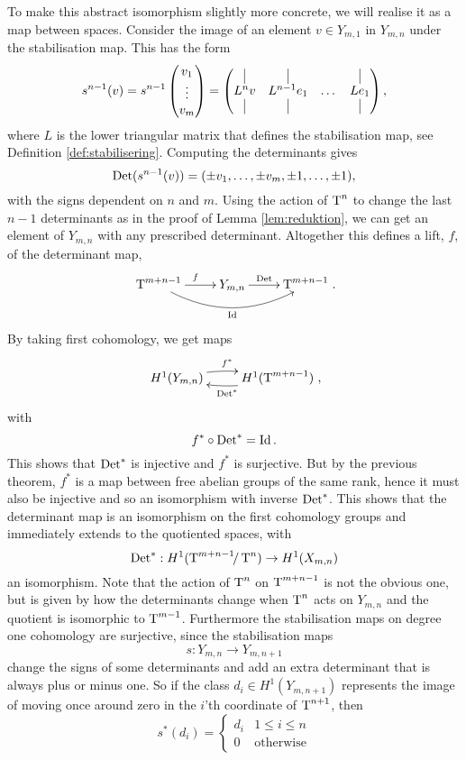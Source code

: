 To make this abstract isomorphism slightly more concrete, we will
realise it as a map between spaces. Consider the image of an element
$v \in Y_{m,1}$ in $Y_{m,n}$ under the stabilisation map. This has the
form 
\[ s^{n-1}(v) = s^{n-1}
\begin{pmatrix}
  v_1 \\
  \vdots \\
  v_m
\end{pmatrix} =
\begin{pmatrix}
  \vrule & \vrule & & \vrule \\
  L^{n} v & L^{n-1}e_1 & \dots & Le_1 \\
  \vrule & \vrule & & \vrule
\end{pmatrix},
\]
where $L$ is the lower triangular matrix that defines the
stabilisation map, see Definition \ref{def:stabilisering}. Computing
the determinants gives
\[ \operatorname{Det}(s^{n-1}(v)) = (\pm v_1,\dots,\pm v_m, \pm 1, \dots,\pm 1), \]
with the signs dependent on $n$ and $m$. Using the action of
$\operatorname{T}^{n}$ to change the last $n-1$ determinants as in the proof of
Lemma \ref{lem:reduktion}, we can get an element of $Y_{m,n}$ with any
prescribed
determinant. Altogether this defines a lift, $f$, of the
determinant map,
\[ \xymatrix{ \T^{m+n-1} \ar[r]^f \ar@/_1.5pc/[rr]_\Id & Y_{m,n}
  \ar[r]^<<<<<\Det & \T^{m+n-1}}. \]
By taking first cohomology, we get maps
\[ \xymatrix{ H^1(Y_{m,n}) \ar@/^/[r]^{f^*} & H^1(\T^{m+n-1})
  \ar@/^/[l]^{\Det^*} }, \]
with 
\[ f^* \circ \operatorname{Det}^* = \operatorname{Id}. \]
This shows that $\operatorname{Det}^*$ is injective and $f^*$ is surjective. But by
the previous theorem, $f^*$ is a map between free abelian groups of
the same rank, hence it must also be injective and so an
isomorphism with inverse $\operatorname{Det}^*$. This shows that the determinant map
is an isomorphism on the first cohomology groups and immediately
extends to the quotiented spaces, with
\[ \operatorname{Det}^* : H^1(\operatorname{T}^{m+n-1}\!\!/\operatorname{T}^{n}) \to H^1(X_{m,n}) \]
an isomorphism. Note that the action of $\operatorname{T}^n$ on $\operatorname{T}^{m+n-1}$ is not
the obvious one, but is given by how the determinants change when
$\operatorname{T}^n$ acts on $Y_{m,n}$ and the quotient is isomorphic to
$\operatorname{T}^{m-1}$. Furthermore the stabilisation
maps on
degree one cohomology are surjective, since the stabilisation maps
\[ s: Y_{m,n} \to Y_{m,n+1} \]
change the signs of some determinants and add an extra determinant
that is always plus or minus one. So if the class $d_i \in
H^1(Y_{m,n+1})$ represents the image of moving once around zero in the
$i$'th coordinate of $\operatorname{T}^{n+1}$, then
\[ s^*(d_i) =
\begin{cases}
  d_i & 1 \leq i \leq n \\
  0 & \text{otherwise}
\end{cases} \]


